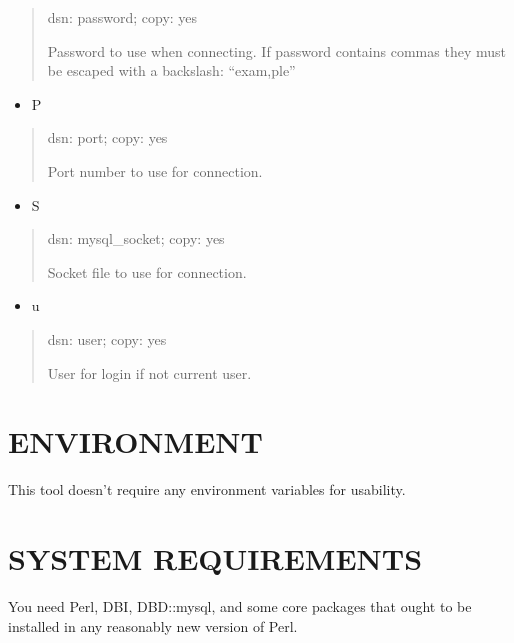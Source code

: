 \documentclass[letterpaper,10pt,english]{sphinxmanual}
\begin{document}
\begin{quote}

dsn: password; copy: yes

Password to use when connecting.
If password contains commas they must be escaped with a backslash: “exam,ple”
\end{quote}
\begin{itemize}
\item {} 
P

\end{itemize}
\begin{quote}

dsn: port; copy: yes

Port number to use for connection.
\end{quote}
\begin{itemize}
\item {} 
S

\end{itemize}
\begin{quote}

dsn: mysql\_socket; copy: yes

Socket file to use for connection.
\end{quote}
\begin{itemize}
\item {} 
u

\end{itemize}
\begin{quote}

dsn: user; copy: yes

User for login if not current user.
\end{quote}


\section{ENVIRONMENT}
\label{\detokenize{mariadb-config-diff:environment}}
This tool doesn’t require any environment variables for usability.


\section{SYSTEM REQUIREMENTS}
\label{\detokenize{mariadb-config-diff:system-requirements}}
You need Perl, DBI, DBD::mysql, and some core packages that ought to be
installed in any reasonably new version of Perl.
\end{document}

